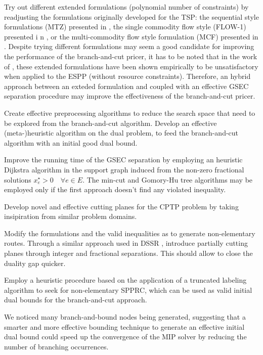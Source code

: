 Try out different extended formulations (polynomial number of constraints)
by readjusting the formulations originally developed for the TSP:
the sequential style formulations (MTZ) presented in \textcite{miller1960},
the single commodity flow style (FLOW-1) presented i n \textcite{gavish1978travelling},
or the multi-commodity flow style formulation (MCF) presented in \textcite{wong1980integer,claus1984new}.
Despite trying different formulations may seem a good candidate for improving
the performance of the branch-and-cut pricer,
it has to be noted that in the work of \textcite{taccari2016},
these extended formulations have been shown empirically
to be unsatisfactory when applied to the ESPP (without resource constraints).
Therefore, an hybrid approach between an exteded formulation
and coupled with an effective GSEC separation procedure may improve
the effectiveness of the branch-and-cut pricer.

Create effective preprocessing algorithms to reduce the search space
that need to be explored from the branch-and-cut algorithm.
Develop an effective (meta-)heuristic algorithm on the dual problem,
to feed the branch-and-cut algorithm with an initial good dual bound.

Improve the running time of the GSEC separation by employing an heuristic
Dijkstra algorithm in the support graph induced from the non-zero fractional solutions $x^\star_e > 0 \quad \forall e \in E$.
The min-cut and Gomory-Hu tree algorithms may be employed only if the first approach
doesn't find any violated inequality.

Develop novel and effective cutting planes for the CPTP problem by taking
insipiration from similar problem domains.

Modify the formulations and the valid inequalities as to generate non-elementary routes.
Through a similar approach used in DSSR \parencite{boland2006, righini2008, martinelli2014},
introduce partially cutting planes through integer and fractional separations.
This should allow to close the duality gap quicker.

Employ a heuristic procedure based on
the application of a truncated labeling algorithm
to seek for non-elementary SPPRC, which can be used as valid initial
dual bounds for the branch-and-cut approach.

\medskip

We noticed many branch-and-bound nodes being generated,
suggesting that a smarter and more effective bounding technique to
generate an effective initial dual bound could speed up the convergence
of the MIP solver by reducing the number of branching occurrences.

